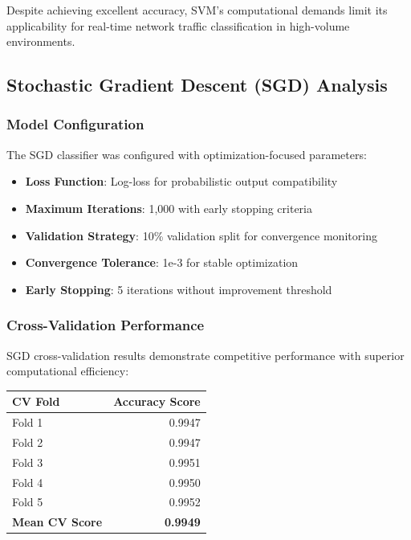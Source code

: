 \documentclass[12pt,a4paper]{article}
\begin{document}
Despite achieving excellent accuracy, SVM's computational demands limit its applicability for real-time network traffic classification in high-volume environments.

\subsection{Stochastic Gradient Descent (SGD) Analysis}

\subsubsection{Model Configuration}

The SGD classifier was configured with optimization-focused parameters:

\begin{itemize}
    \item \textbf{Loss Function}: Log-loss for probabilistic output compatibility
    \item \textbf{Maximum Iterations}: 1,000 with early stopping criteria
    \item \textbf{Validation Strategy}: 10\% validation split for convergence monitoring
    \item \textbf{Convergence Tolerance}: 1e-3 for stable optimization
    \item \textbf{Early Stopping}: 5 iterations without improvement threshold
\end{itemize}

\subsubsection{Cross-Validation Performance}

SGD cross-validation results demonstrate competitive performance with superior computational efficiency:

\begin{center}
\begin{tabular}{|l|r|}
\hline
\textbf{CV Fold} & \textbf{Accuracy Score} \\
\hline
Fold 1 & 0.9947 \\
\hline
Fold 2 & 0.9947 \\
\hline
Fold 3 & 0.9951 \\
\hline
Fold 4 & 0.9950 \\
\hline
Fold 5 & 0.9952 \\
\hline
\textbf{Mean CV Score} & \textbf{0.9949} \\
\hline
\end{tabular}
\end{center}
\end{document}
